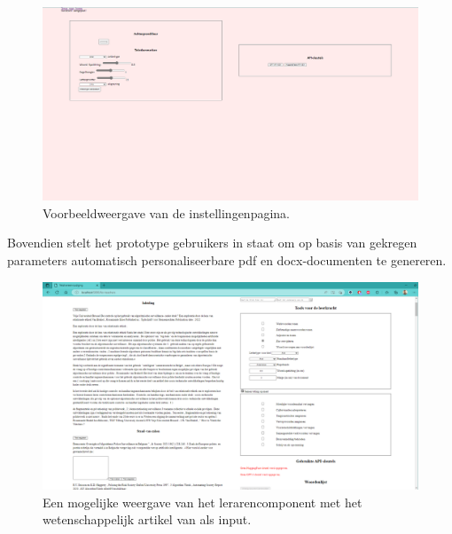 \begin{center}
	\begin{figure}[H]
		\includegraphics[width=\linewidth]{img/website-instellingen.png}
		\caption{Voorbeeldweergave van de instellingenpagina.}
		\label{img:website-instellingen}
	\end{figure}
\end{center}

Bovendien stelt het prototype gebruikers in staat om op basis van gekregen parameters automatisch personaliseerbare pdf en docx-documenten te genereren.

\begin{figure}[H]
	\includegraphics[width=\linewidth]{img/proto-lerarencomponent.png}
	\caption{Een mogelijke weergave van het lerarencomponent met het wetenschappelijk artikel van \textcite{VanBrakel2022} als input.}
	\label{img:proto-lerarencomponent}
\end{figure}

